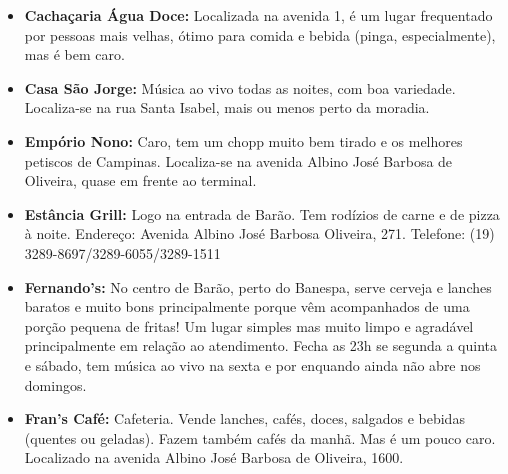\begin{itemize}
\item  \textbf{Cachaçaria Água Doce:} Localizada na avenida 1, é um lugar frequentado por pessoas mais velhas, ótimo para comida e bebida (pinga, especialmente), mas é bem caro.
\end{itemize}

\begin{itemize}
\item  \textbf{Casa São Jorge:} Música ao vivo todas as noites, com boa variedade. Localiza-se na rua Santa Isabel, mais ou menos perto da moradia.
\end{itemize}

\begin{itemize}
\item  \textbf{Empório Nono:} Caro, tem um chopp muito bem tirado e os melhores petiscos de Campinas. Localiza-se na avenida Albino José Barbosa de Oliveira, quase em frente ao terminal.
\end{itemize}

\begin{itemize}
\item  \textbf{Estância Grill:} Logo na entrada de Barão. Tem rodízios de carne e de pizza à noite. Endereço: Avenida Albino José Barbosa Oliveira, 271. Telefone: (19) 3289-8697/3289-6055/3289-1511
\end{itemize}

\begin{itemize}
\item  \textbf{Fernando's:} No centro de Barão, perto do Banespa, serve cerveja e lanches baratos e muito bons principalmente porque vêm acompanhados de uma porção pequena de fritas! Um lugar simples mas muito limpo e agradável principalmente em relação ao atendimento. Fecha as 23h se segunda a quinta e sábado, tem música ao vivo na sexta e por enquando ainda não abre nos domingos.
\end{itemize}

\begin{itemize}
\item  \textbf{Fran's Café:} Cafeteria. Vende lanches, cafés, doces, salgados e bebidas (quentes ou geladas). Fazem também cafés da manhã. Mas é um pouco caro. Localizado na avenida Albino José Barbosa de Oliveira, 1600.
\end{itemize}

